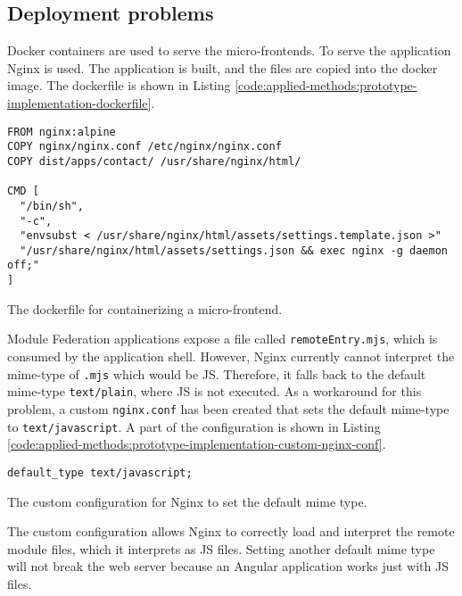 \subsection{Deployment problems}\label{subsection:applied-methods:prototypical-implementation:nginx-problems}

Docker containers are used to serve the micro-frontends. To serve the application Nginx is used. The application is built, and the files are copied into the docker image. The dockerfile is shown in Listing \ref{code:applied-methods:prototype-implementation-dockerfile}.

\ifshowListings
  \begin{listing}[H]
  \begin{verbatim}
FROM nginx:alpine
COPY nginx/nginx.conf /etc/nginx/nginx.conf
COPY dist/apps/contact/ /usr/share/nginx/html/
    
CMD [
  "/bin/sh", 
  "-c", 
  "envsubst < /usr/share/nginx/html/assets/settings.template.json >" 
  "/usr/share/nginx/html/assets/settings.json && exec nginx -g daemon off;"
]
  \end{verbatim}
  \caption{The dockerfile for containerizing a micro-frontend.}\label{code:applied-methods:prototype-implementation-dockerfile}
  \end{listing}
\fi

\noindent Module Federation applications expose a file called \texttt{remoteEntry.mjs}, which is consumed by the application shell. However, Nginx currently cannot interpret the mime-type of \texttt{\*.mjs} which would be \ac{JS}. Therefore, it falls back to the default mime-type \texttt{text/plain}, where \ac{JS} is not executed. As a workaround for this problem, a custom \texttt{nginx.conf} has been created that sets the default mime-type to \texttt{text/javascript}. A part of the configuration is shown in Listing \ref{code:applied-methods:prototype-implementation-custom-nginx-conf}.

\ifshowListings
  \begin{listing}[H]
  \begin{verbatim}
default_type text/javascript;
  \end{verbatim}
  \caption{The custom configuration for Nginx to set the default mime type.}\label{code:applied-methods:prototype-implementation-custom-nginx-conf}
  \end{listing}
\fi

\noindent The custom configuration allows Nginx to correctly load and interpret the remote module files, which it interprets as \ac{JS} files. Setting another default mime type will not break the web server because an Angular application works just with \ac{JS} files.
